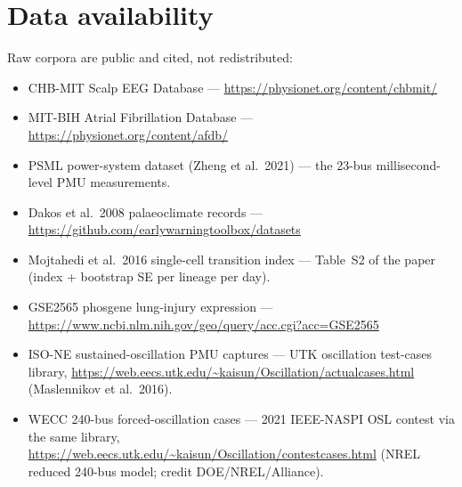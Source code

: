 \documentclass[11pt]{article}
\begin{document}
\section{Data availability}\label{sec:data}

Raw corpora are public and cited, not redistributed:

\begin{itemize}
  \item CHB-MIT Scalp EEG Database ---
    \url{https://physionet.org/content/chbmit/}
  \item MIT-BIH Atrial Fibrillation Database ---
    \url{https://physionet.org/content/afdb/}
  \item PSML power-system dataset (Zheng et al.\ 2021) --- the 23-bus
    millisecond-level PMU measurements.
  \item Dakos et al.\ 2008 palaeoclimate records ---
    \url{https://github.com/earlywarningtoolbox/datasets}
  \item Mojtahedi et al.\ 2016 single-cell transition index ---
    Table~S2 of the paper (index + bootstrap SE per lineage per day).
  \item GSE2565 phosgene lung-injury expression ---
    \url{https://www.ncbi.nlm.nih.gov/geo/query/acc.cgi?acc=GSE2565}
  \item ISO-NE sustained-oscillation PMU captures --- UTK oscillation
    test-cases library,
    \url{https://web.eecs.utk.edu/~kaisun/Oscillation/actualcases.html}
    (Maslennikov et al.\ 2016).
  \item WECC 240-bus forced-oscillation cases --- 2021 IEEE-NASPI OSL
    contest via the same library,
    \url{https://web.eecs.utk.edu/~kaisun/Oscillation/contestcases.html}
    (NREL reduced 240-bus model; credit DOE/NREL/Alliance).
\end{itemize}
\end{document}
